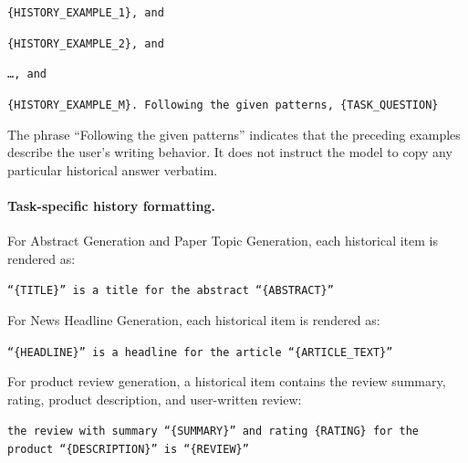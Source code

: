 \documentclass{article} %
\begin{document}
\begin{tcolorbox}[
    colback=gray!5,
    colframe=black!45,
    title=Full-history conditioning template,
    breakable,
    left=3pt,
    right=3pt,
    top=3pt,
    bottom=3pt
]
\small
\texttt{\{HISTORY\_EXAMPLE\_1\}, and}

\texttt{\{HISTORY\_EXAMPLE\_2\}, and}

\texttt{\ldots, and}

\texttt{\{HISTORY\_EXAMPLE\_M\}. Following the given patterns, \{TASK\_QUESTION\}}
\end{tcolorbox}

The phrase ``Following the given patterns'' indicates that the preceding examples describe the user's writing behavior. It does not instruct the model to copy any particular historical answer verbatim.

\paragraph{Task-specific history formatting.}
For Abstract Generation and Paper Topic Generation, each historical item is rendered as:

\begin{tcolorbox}[
    colback=gray!5,
    colframe=black!45,
    title=Academic history example,
    breakable,
    left=3pt,
    right=3pt,
    top=3pt,
    bottom=3pt
]
\small
\texttt{``\{TITLE\}'' is a title for the abstract ``\{ABSTRACT\}''}
\end{tcolorbox}

For News Headline Generation, each historical item is rendered as:

\begin{tcolorbox}[
    colback=gray!5,
    colframe=black!45,
    title=News history example,
    breakable,
    left=3pt,
    right=3pt,
    top=3pt,
    bottom=3pt
]
\small
\texttt{``\{HEADLINE\}'' is a headline for the article ``\{ARTICLE\_TEXT\}''}
\end{tcolorbox}

For product review generation, a historical item contains the review summary, rating, product description, and user-written review:

\begin{tcolorbox}[
    colback=gray!5,
    colframe=black!45,
    title=Product-review history example,
    breakable,
    left=3pt,
    right=3pt,
    top=3pt,
    bottom=3pt
]
\small
\texttt{the review with summary ``\{SUMMARY\}'' and rating \{RATING\} for the product ``\{DESCRIPTION\}'' is ``\{REVIEW\}''}
\end{tcolorbox}
\end{document}
